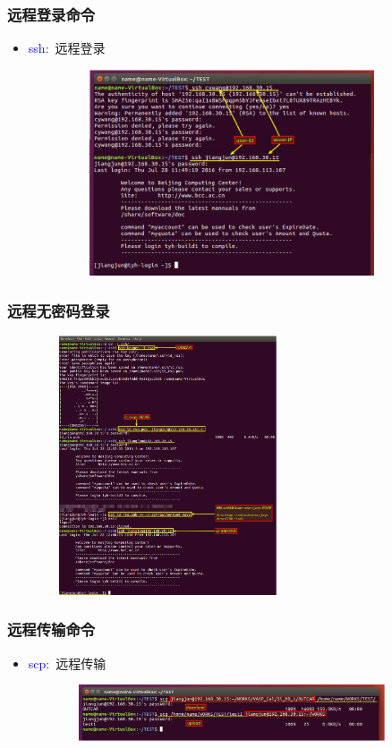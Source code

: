 \frame
{
	\frametitle{远程登录命令}
	\begin{itemize}
		\item \textcolor{blue}{ssh}:~远程登录
\begin{figure}[h!]
\centering
\vspace{-10.5pt}
\includegraphics[height=2.4in,width=3.9in,viewport=0 0 800 550,clip]{Figures/Ubuntu-ssh.png}
\label{Linux-command-ssh}
\end{figure}
	\end{itemize}
}

\frame
{
	\frametitle{远程无密码登录}
\begin{figure}[h!]
\centering
\vspace{-13.2pt}
\includegraphics[height=3.02in,width=2.9in,viewport=0 0 1080 1130,clip]{Figures/Ubuntu-auto-ssh.png}
\label{Linux-command-auto-ssh}
\end{figure}
}

\frame
{
	\frametitle{远程传输命令}
	\begin{itemize}
		\item \textcolor{blue}{scp}:~远程传输
\begin{figure}[h!]
\centering
\vspace{-10.5pt}
\includegraphics[height=0.65in,width=3.9in,viewport=0 0 1080 200,clip]{Figures/Ubuntu-scp.png}
\label{Linux-command-scp}
\end{figure}
	\end{itemize}
}

